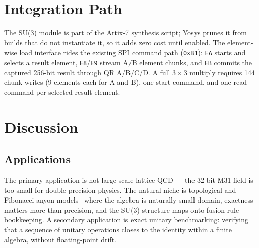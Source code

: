 \documentclass[conference]{IEEEtran}
\begin{document}
\begin{table}[ht]
\centering
\caption{Silicon QR readback, standalone SU3 spin (2026-07-04).}
\label{tab:silicon}
\end{table}

\section{Integration Path}

The SU(3) module is part of the Artix-7 synthesis script; Yosys prunes it
from builds that do not instantiate it, so it adds zero cost until enabled.
The element-wise load interface rides the existing SPI command path
(\texttt{0xB1}): \texttt{EA} starts and selects a result element,
\texttt{E8}/\texttt{E9} stream A/B element chunks, and \texttt{EB} commits
the captured 256-bit result through QR A/B/C/D. A full $3\times3$ multiply
requires 144 chunk writes (9 elements each for A and B), one start command,
and one read command per selected result element.

\section{Discussion}

\subsection{Applications}

The primary application is not large-scale lattice QCD --- the 32-bit M31
field is too small for double-precision physics. The natural niche is
topological and Fibonacci anyon models~\cite{freedman2000} where the
algebra is naturally small-domain, exactness matters more than precision,
and the SU(3) structure maps onto fusion-rule bookkeeping. A secondary
application is exact unitary benchmarking: verifying that a sequence of
unitary operations closes to the identity within a finite algebra, without
floating-point drift.
\end{document}

